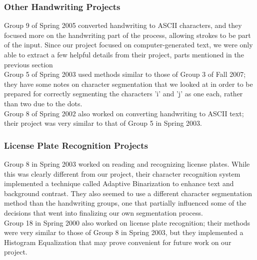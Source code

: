 \subsubsection{Other Handwriting Projects}
Group 9 of Spring 2005 converted handwriting to ASCII characters, and they focused more on the handwriting part of the process, allowing strokes to be part of the input. Since our project focused on computer-generated text, we were only able to extract a few helpful details from their project, parts mentioned in the previous section\\
Group 5 of Spring 2003 used methods similar to those of Group 3 of Fall 2007; they have some notes on character segmentation that we looked at in order to be prepared for correctly segmenting the characters 'i' and 'j' as one each, rather than two due to the dots.\\
Group 8 of Spring 2002 also worked on converting handwriting to ASCII text; their project was very similar to that of Group 5 in Spring 2003.\\

\subsubsection{License Plate Recognition Projects}
Group 8 in Spring 2003 worked on reading and recognizing license plates. While this was clearly different from our project, their character recognition system implemented a technique called Adaptive Binarization to enhance text and background contrast. They also seemed to use a different character segmentation method than the handwriting groups, one that partially influenced some of the decisions that went into finalizing our own segmentation process.\\
Group 18 in Spring 2000 also worked on license plate recognition; their methods were very similar to those of Group 8 in Spring 2003, but they implemented a Histogram Equalization that may prove convenient for future work on our project.\\
